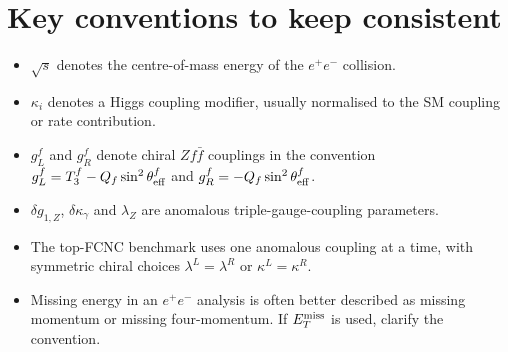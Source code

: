 \documentclass[11pt,a4paper]{report}
\newcommand{\ee}{e^+e^-}
\begin{document}
\section{Key conventions to keep consistent}
\begin{itemize}
\item $\sqrt{s}$ denotes the centre-of-mass energy of the $\ee$ collision.
\item $\kappa_i$ denotes a Higgs coupling modifier, usually normalised to the SM coupling or rate contribution.
\item $g_L^f$ and $g_R^f$ denote chiral $Zf\bar f$ couplings in the convention $g_L^f=T_3^f-Q_f\sin^2\theta_{\rm eff}^f$ and $g_R^f=-Q_f\sin^2\theta_{\rm eff}^f$.
\item $\delta g_{1,Z}$, $\delta\kappa_\gamma$ and $\lambda_Z$ are anomalous triple-gauge-coupling parameters.
\item The top-FCNC benchmark uses one anomalous coupling at a time, with symmetric chiral choices $\lambda^L=\lambda^R$ or $\kappa^L=\kappa^R$.
\item Missing energy in an $\ee$ analysis is often better described as missing momentum or missing four-momentum.  If $E_T^{\rm miss}$ is used, clarify the convention.
\end{itemize}
\end{document}
